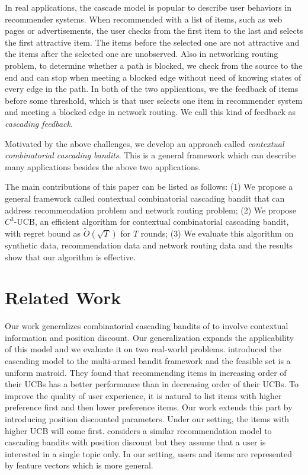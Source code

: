 \documentclass{article}
\begin{document}
In real applications, the cascade model is popular to describe user behaviors in recommender systems. When recommended with a list of items, such as web pages or advertisements, the user checks from the first item to the last and selects the first attractive item. The items before the selected one are not attractive and the items after the selected one are unobserved. Also in networking routing problem, to determine whether a path is blocked, we check from the source to the end and can stop when meeting a blocked edge without need of knowing states of every edge in the path. In both of the two applications, we the feedback of items before some threshold, which is that user selects one item in recommender system and meeting a blocked edge in network routing. We call this kind of feedback as {\it cascading feedback}. 

Motivated by the above challenges, we develop an approach called {\it contextual combinatorial cascading bandits}. This is a general framework which can describe many applications besides the above two applications.

The main contributions of this paper can be listed as follows: (1) We propose a general framework called contextual combinatorial cascading bandit that can address recommendation problem and network routing problem; (2) We propose $C^3$-UCB, an efficient algorithm for contextual combinatorial cascading bandit, with regret bound as $\tilde{O}(\sqrt{T})$ for $T$ rounds; (3) We evaluate this algorithm on synthetic data, recommendation data and network routing data and the results show that our algorithm is effective.


\section{Related Work}

Our work generalizes combinatorial cascading bandits of \cite{kveton2015combinatorial} to involve contextual information and position discount. Our generalization expands the applicability of this model and we evaluate it on two real-world problems. \cite{kveton2015cascading} introduced the cascading model to the multi-armed bandit framework and the feasible set is a uniform matroid. They found that recommending items in increasing order of their UCBs has a better performance than in decreasing order of their UCBs. To improve the quality of user experience, it is natural to list items with higher preference first and then lower preference items. Our work extends this part by introducing position discounted parameters. Under our setting, the items with higher UCB will come first. \cite{combes2015learning} considers a similar recommendation model to cascading bandits with position discount but they assume that a user is interested in a single topic only. In our setting, users and items are represented by feature vectors which is more general.
\end{document}

